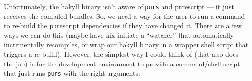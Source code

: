 \documentclass[]{article}
\newenvironment{Shaded}{}{}
\newcommand{\BuiltInTok}[1]{\textcolor[rgb]{0.00,0.50,0.00}{#1}}
\newcommand{\KeywordTok}[1]{\textcolor[rgb]{0.00,0.44,0.13}{\textbf{#1}}}
\newcommand{\NormalTok}[1]{#1}
\newcommand{\OperatorTok}[1]{\textcolor[rgb]{0.40,0.40,0.40}{#1}}
\newcommand{\SpecialCharTok}[1]{\textcolor[rgb]{0.25,0.44,0.63}{#1}}
\newcommand{\StringTok}[1]{\textcolor[rgb]{0.25,0.44,0.63}{#1}}
\newcommand{\VariableTok}[1]{\textcolor[rgb]{0.10,0.09,0.49}{#1}}
\begin{document}
Unfortunately, the hakyll binary isn't aware of \texttt{purs} and purescript ---
it just receives the compiled bundles. So, we need a way for the user to run a
command to re-build the purescript dependencies if they have changed it. There
are a few ways we can do this (maybe have nix initiate a ``watcher'' that
automatically incrementally recompiles, or wrap our hakyll binary in a wrapper
shell script that triggers a re-build). However, the simplest way I could think
of (that also does the job) is for the development environment to provide a
command/shell script that just runs \texttt{purs} with the right arguments.

\begin{Shaded}
\end{Shaded}
\end{document}
